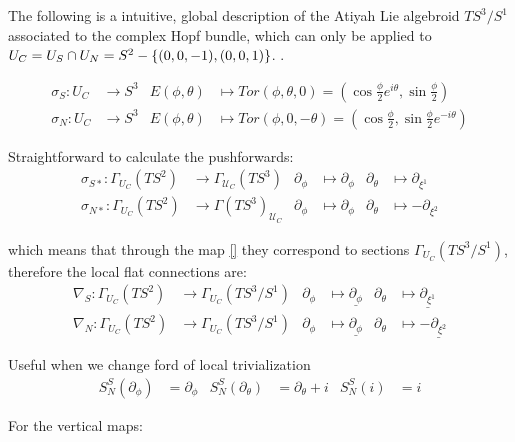 \linea

The following is a intuitive, global description of the Atiyah Lie algebroid $TS^3/S^1$ associated to the complex Hopf bundle, which can only be applied to $U_C = U_S \cap U_N = S^2 - \left\{ (0, 0, -1), (0, 0, 1) \right\}$. .

\begin{align*}
    \sigma_S : U_C &\to S^3 &       E(\phi, \theta) &\mapsto Tor(\phi, \theta, 0) = (\cos \frac{\phi}{2} e^{i \theta}, \sin \frac{\phi}{2} )\\
    \sigma_N : U_C &\to S^3 &       E(\phi, \theta) &\mapsto Tor(\phi, 0, -\theta) = (\cos \frac{\phi}{2} , \sin \frac{\phi}{2} e^{-i \theta})
\end{align*}

Straightforward to calculate the pushforwards:
\begin{align*}
    \sigma_{S*} : \Gamma_{U_C}(TS^2) &\to \Gamma_{\mathcal U_C}(TS^3) & \partial_\phi &\mapsto \partial_\phi & \partial_\theta &\mapsto \partial_{\xi^1}   \\
    \sigma_{N*} : \Gamma_{U_C}(TS^2) &\to \Gamma(TS^3)_{\mathcal U_C} & \partial_\phi &\mapsto \partial_\phi & \partial_\theta &\mapsto -\partial_{\xi^2}      
\end{align*}

which means that through the map \ref{} they correspond to sections $\Gamma_{U_C}(TS^3/S^1)$, therefore the local flat connections are:
\begin{align}
    \nabla_{S} : \Gamma_{U_C}(TS^2) &\to \Gamma_{U_C}(TS^3/S^1) & \partial_\phi &\mapsto \underline{\partial_\phi} & \partial_\theta &\mapsto \underline{\partial_{\xi^1}}   \\
    \nabla_{N} : \Gamma_{U_C}(TS^2) &\to \Gamma_{U_C}(TS^3/S^1) & \partial_\phi &\mapsto \underline{\partial_\phi} & \partial_\theta &\mapsto -\underline{\partial_{\xi^2}}
\end{align}

Useful when we change ford of local trivialization
\begin{align*}
    S^S_N(\partial_\phi) &= \partial_\phi &  S^S_N(\partial_\theta) &= \partial_\theta + i & S^S_N(i) &= i
\end{align*}

\lin 

For the vertical maps:

